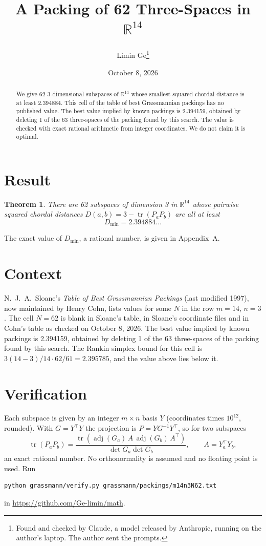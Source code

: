 \documentclass[11pt,a4paper]{article}
\title{A Packing of 62 Three-Spaces in $\mathbb{R}^{14}$}
\author{Limin Ge\thanks{Found and checked by Claude, a model released by Anthropic, running on the author's laptop. The author sent the prompts.}}
\date{October 8, 2026}
\newtheorem*{theorem}{Theorem}
\begin{document}
\maketitle
\begin{abstract}
We give 62 3-dimensional subspaces of $\mathbb{R}^{14}$ whose smallest squared chordal distance is at least 2.394884. This cell of the table of best Grassmannian packings has no published value. The best value implied by known packings is 2.394159, obtained by deleting 1 of the 63 three-spaces of the packing found by this search. The value is checked with exact rational arithmetic from integer coordinates. We do not claim it is optimal.
\end{abstract}

\section{Result}
\begin{theorem}
There are 62 subspaces of dimension 3 in $\mathbb{R}^{14}$ whose pairwise squared chordal distances $D(a,b) = 3 - \operatorname{tr}(P_aP_b)$ are all at least
\[ D_{\min} = 2.394884\ldots \]
\end{theorem}
The exact value of $D_{\min}$, a rational number, is given in Appendix~A.


\section{Context}
N.~J.~A.~Sloane's \emph{Table of Best Grassmannian Packings} (last modified 1997), now maintained by Henry Cohn, lists values for some $N$ in the row $m=14$, $n=3$. The cell $N=62$ is blank in Sloane's table, in Sloane's coordinate files and in Cohn's table as checked on October 8, 2026. The best value implied by known packings is 2.394159, obtained by deleting 1 of the 63 three-spaces of the packing found by this search. The Rankin simplex bound for this cell is $3(14-3)/14\cdot 62/61 = 2.395785$, and the value above lies below it.


\section{Verification}
Each subspace is given by an integer $m\times n$ basis $Y$ (coordinates times $10^{12}$, rounded). With $G=Y^\top Y$ the projection is $P=YG^{-1}Y^\top$, so for two subspaces
\[ \operatorname{tr}(P_aP_b)=\frac{\operatorname{tr}(\operatorname{adj}(G_a)\,A\,\operatorname{adj}(G_b)\,A^\top)}{\det G_a\det G_b},\qquad A=Y_a^\top Y_b, \]
an exact rational number. No orthonormality is assumed and no floating point is used. Run
\begin{verbatim}
python grassmann/verify.py grassmann/packings/m14n3N62.txt
\end{verbatim}
in \url{https://github.com/Ge-limin/math}.
\end{document}
